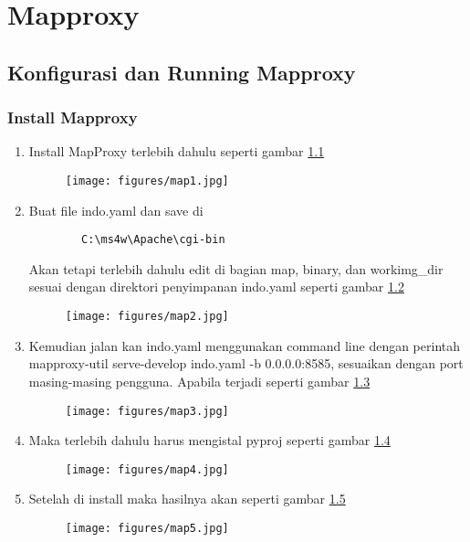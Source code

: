 \chapter{Mapproxy}
\section{Konfigurasi dan Running Mapproxy}
\subsection{Install Mapproxy}
\begin{enumerate}
    \item Install MapProxy terlebih dahulu seperti gambar \ref{map1}
\begin{figure}[!htbp]
    \centering
    \texttt{[image: figures/map1.jpg]}
    \label{map1}
\end{figure}
    \item Buat file indo.yaml dan save di
    \begin{verbatim}
        C:\ms4w\Apache\cgi-bin
    \end{verbatim}
    Akan tetapi terlebih dahulu edit di bagian map, binary, dan workimg\_dir sesuai dengan direktori penyimpanan indo.yaml seperti gambar \ref{map2}
\begin{figure}[!htbp]
    \centering
    \texttt{[image: figures/map2.jpg]}
    \label{map2}
\end{figure}
    \item Kemudian jalan kan indo.yaml menggunakan command line dengan perintah mapproxy-util serve-develop indo.yaml -b 0.0.0.0:8585, sesuaikan dengan port masing-masing pengguna. Apabila terjadi seperti gambar \ref{map3}
\begin{figure}[!htbp]
    \centering
    \texttt{[image: figures/map3.jpg]}
    \label{map3}
\end{figure}
    \item Maka terlebih dahulu harus mengistal pyproj seperti gambar \ref{map4}
\begin{figure}[!htbp]
    \centering
    \texttt{[image: figures/map4.jpg]}
    \label{map4}
\end{figure}
    \item Setelah di install maka hasilnya akan seperti gambar \ref{map5}
\begin{figure}[!htbp]
    \centering
    \texttt{[image: figures/map5.jpg]}
    \label{map5}
\end{figure}

\end{enumerate}
